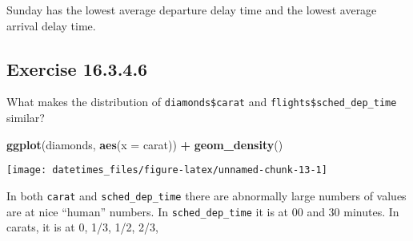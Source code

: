\documentclass[]{book}
\newenvironment{Shaded}{\begin{snugshade}}{\end{snugshade}}
\newcommand{\CommentTok}[1]{\textcolor[rgb]{0.56,0.35,0.01}{\textit{#1}}}
\newcommand{\DataTypeTok}[1]{\textcolor[rgb]{0.13,0.29,0.53}{#1}}
\newcommand{\KeywordTok}[1]{\textcolor[rgb]{0.13,0.29,0.53}{\textbf{#1}}}
\newcommand{\NormalTok}[1]{#1}
\newcommand{\OperatorTok}[1]{\textcolor[rgb]{0.81,0.36,0.00}{\textbf{#1}}}
\newcommand{\OtherTok}[1]{\textcolor[rgb]{0.56,0.35,0.01}{#1}}
\newcommand{\StringTok}[1]{\textcolor[rgb]{0.31,0.60,0.02}{#1}}
\theoremstyle{plain}
\theoremstyle{remark}
\begin{document}
Sunday has the lowest average departure delay time and the lowest
average arrival delay time.

\begin{Shaded}
\end{Shaded}

\hypertarget{exercise-16.3.4.6}{%
\subsection*{\texorpdfstring{Exercise
{16.3.4.6}}{Exercise 16.3.4.6}}\label{exercise-16.3.4.6}}

What makes the distribution of \texttt{diamonds\$carat} and
\texttt{flights\$sched\_dep\_time} similar?

\begin{Shaded}
\begin{Highlighting}[]
\KeywordTok{ggplot}\NormalTok{(diamonds, }\KeywordTok{aes}\NormalTok{(}\DataTypeTok{x =}\NormalTok{ carat)) }\OperatorTok{+}
\StringTok{  }\KeywordTok{geom_density}\NormalTok{()}
\end{Highlighting}
\end{Shaded}

\begin{center}\texttt{[image: datetimes\_files/figure-latex/unnamed-chunk-13-1]} \end{center}

In both \texttt{carat} and \texttt{sched\_dep\_time} there are
abnormally large numbers of values are at nice ``human'' numbers. In
\texttt{sched\_dep\_time} it is at 00 and 30 minutes. In carats, it is
at 0, 1/3, 1/2, 2/3,
\end{document}
